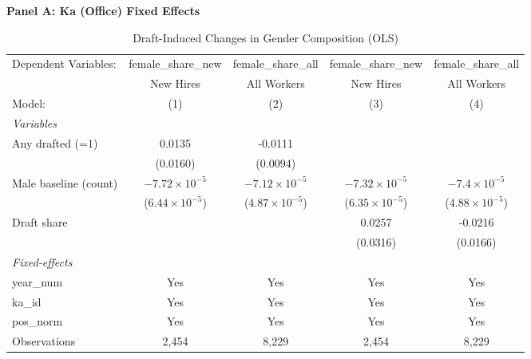 \begin{table}[htbp]
\centering
\begin{threeparttable}
\caption{Draft-Induced Changes in Gender Composition (OLS)}
\label{tab:gender-composition}
\small
\textbf{Panel A: Ka (Office) Fixed Effects}\\[1ex]
\begingroup
\centering
\begin{tabular}{lcccc}
   \tabularnewline \midrule \midrule
   Dependent Variables:  & female\_share\_new      & female\_share\_all      & female\_share\_new      & female\_share\_all\\    
                         & New Hires               & All Workers             & New Hires               & All Workers \\   
   Model:                & (1)                     & (2)                     & (3)                     & (4)\\  
   \midrule
   \emph{Variables}\\
   Any drafted (=1)      & 0.0135                  & -0.0111                 &                         &   \\   
                         & (0.0160)                & (0.0094)                &                         &   \\   
   Male baseline (count) & $-7.72\times 10^{-5}$   & $-7.12\times 10^{-5}$   & $-7.32\times 10^{-5}$   & $-7.4\times 10^{-5}$\\    
                         & ($6.44\times 10^{-5}$)  & ($4.87\times 10^{-5}$)  & ($6.35\times 10^{-5}$)  & ($4.88\times 10^{-5}$)\\    
   Draft share           &                         &                         & 0.0257                  & -0.0216\\   
                         &                         &                         & (0.0316)                & (0.0166)\\   
   \midrule
   \emph{Fixed-effects}\\
   year\_num             & Yes                     & Yes                     & Yes                     & Yes\\  
   ka\_id                & Yes                     & Yes                     & Yes                     & Yes\\  
   pos\_norm             & Yes                     & Yes                     & Yes                     & Yes\\  
   \midrule
   Observations          & 2,454                   & 8,229                   & 2,454                   & 8,229\\  

\end{tabular}
\end{threeparttable}
\end{table}
